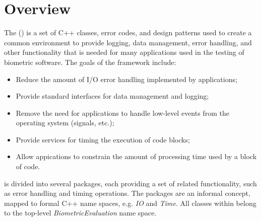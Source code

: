\chapter{Overview}

The \lname (\sname)
is a set of C++\cite{cpp:plguide} classes, error codes, and design
patterns used to create a common environment to provide logging, data
management, error handling, and other functionality that is needed for many
applications used in the testing of biometric software. The goals of the
framework include:
\begin{itemize}
\item Reduce the amount of I/O error handling implemented by applications;
\item Provide standard interfaces for data management and logging;
\item Remove the need for applications to handle low-level events from the
operating system (signals, etc.);
\item Provide services for timing the execution of code blocks;
\item Allow appications to constrain the amount of processing time used
by a block of code.
\end{itemize}

\sname is divided into several packages, each providing a set of
related functionality, such as error handling and timing operations. The
packages are an informal concept, mapped to formal C++ name spaces, e.g.
{\em IO} and {\em Time}.
All classes within \sname belong to the top-level {\em BiometricEvaluation}
name space.
